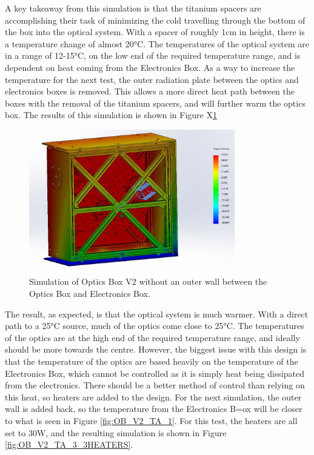 A key takeaway from this simulation is that the titanium spacers are accomplishing their task of minimizing the cold travelling through the bottom of the box into the optical system. With a spacer of roughly 1cm in height, there is a temperature change of almost 20°C. The temperatures of the optical system are in a range of 12-15°C, on the low end of the required temperature range, and is dependent on heat coming from the Electronics Box. As a way to increase the temperature for the next test, the outer radiation plate between the optics and electronics boxes is removed. This allows a more direct heat path between the boxes with the removal of the titanium spacers, and will further warm the optics box. The results of this simulation is shown in Figure X\ref{fig:OB_V2_TA_2}

\begin{figure}
    \centering
    \includegraphics[width=0.8\textwidth]{chap3_images/LIFE_V2_images/TA_25_-30_no_front_left_outer_walls.JPG}
    \caption{Simulation of Optics Box V2 without an outer wall between the Optics Box and Electronics Box.}
    \label{fig:OB_V2_TA_2}
\end{figure}

The result, as expected, is that the optical system is much warmer. With a direct path to a 25°C source, much of the optics come close to 25°C. The temperatures of the optics are at the high end of the required temperature range, and ideally should be more towards the centre. However, the biggest issue with this design is that the temperature of the optics are based heavily on the temperature of the Electronics Box, which cannot be controlled as it is simply heat being dissipated from the electronics. There should be a better method of control than relying on this heat, so heaters are added to the design. For the next simulation, the outer wall is added back, so the temperature from the Electronics B=ox will be closer to what is seen in Figure \ref{fig:OB_V2_TA_1}. For this test, the heaters are all set to 30W, and the resulting simulation is shown in Figure \ref{fig:OB_V2_TA_3_3HEATERS}.

